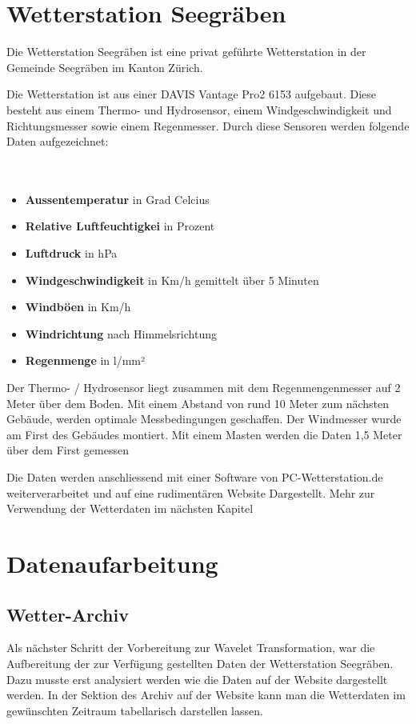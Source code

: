 \begin{refsection}
\section{Wetterstation Seegräben}

Die Wetterstation Seegräben ist eine privat geführte Wetterstation in der Gemeinde Seegräben im Kanton Zürich\cite{online:wss}.

Die Wetterstation ist aus einer DAVIS Vantage Pro2 6153 aufgebaut.
Diese besteht aus einem Thermo- und  Hydrosensor, einem Windgeschwindigkeit und Richtungsmesser sowie einem Regenmesser. 
Durch diese Sensoren werden folgende Daten aufgezeichnet:
\\
\\
\\


\begin{itemize}
	\item \textbf{Aussentemperatur} in Grad Celcius
	\item \textbf{Relative Luftfeuchtigkei} in Prozent
	\item \textbf{Luftdruck} in hPa
	\item \textbf{Windgeschwindigkeit} in Km/h gemittelt über 5 Minuten
	\item \textbf{Windböen} in Km/h
	\item \textbf{Windrichtung} nach Himmelsrichtung
	\item \textbf{Regenmenge} in l/mm²
\end{itemize}	


Der Thermo- / Hydrosensor liegt zusammen mit dem Regenmengenmesser auf 2 Meter über dem Boden. Mit einem Abstand von rund 10 Meter zum nächsten Gebäude, werden optimale Messbedingungen geschaffen. Der Windmesser wurde am First des Gebäudes montiert. Mit einem Masten werden die Daten 1,5 Meter über dem First gemessen 

Die Daten werden anschliessend mit einer Software von PC-Wetterstation.de weiterverarbeitet und auf eine rudiment\"aren Website Dargestellt. Mehr zur Verwendung der Wetterdaten im n\"achsten Kapitel




\section{Datenaufarbeitung}
\subsection{Wetter-Archiv}
Als n\"achster Schritt der Vorbereitung zur Wavelet Transformation, war die Aufbereitung der zur Verf\"ugung gestellten Daten der Wetterstation Seegr\"aben.
Dazu musste erst analysiert werden wie die Daten auf der Website dargestellt werden.
In der Sektion des Archiv auf der Website kann man die Wetterdaten im gew\"unschten Zeitraum tabellarisch darstellen lassen.

\end{refsection}
